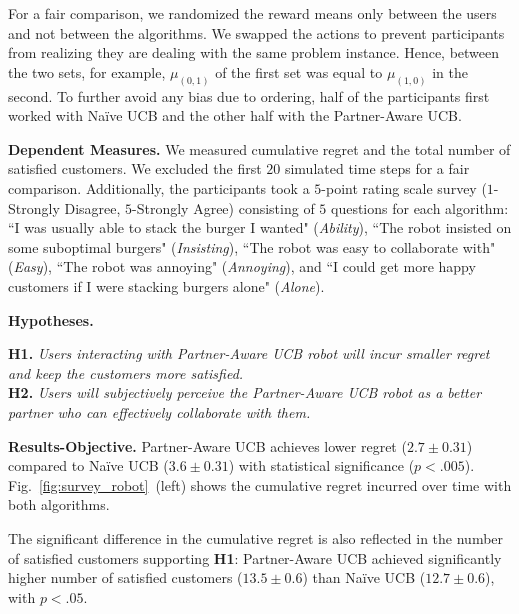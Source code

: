 \documentclass[letterpaper]{article} %
\theoremstyle{definition}
\renewenvironment{quote}
  {\list{}{\rightmargin=0cm \leftmargin=0.25cm}%
   \item\relax}
  {\endlist}
\begin{document}
For a fair comparison, we randomized the reward means only between the users and not between the algorithms.
We swapped the actions to prevent participants from realizing they are dealing with the same problem instance. Hence, between the two sets, for example, $\mu_{(0,1)}$ of the first set was equal to $\mu_{(1,0)}$ in the second. 
To further avoid any bias due to ordering, half of the participants first worked with Na\"ive UCB and the other half with the Partner-Aware UCB.

\smallskip
\noindent\textbf{Dependent Measures.} 
We measured cumulative regret and the total number of satisfied customers. We excluded the first $20$ simulated time steps for a fair comparison. Additionally, the participants took a $5$-point rating scale survey ($1$-Strongly Disagree, $5$-Strongly Agree) consisting of $5$ questions for each algorithm: ``I was usually able to stack the burger I wanted" (\emph{Ability}), ``The robot insisted on some suboptimal burgers" (\emph{Insisting}), ``The robot was easy to collaborate with" (\emph{Easy}), ``The robot was annoying" (\emph{Annoying}), and ``I could get more happy customers if I were stacking burgers alone" (\emph{Alone}).


\smallskip
\noindent\textbf{Hypotheses.}
\begin{quote}
    \textbf{H1.} \textit{Users interacting with Partner-Aware UCB robot will incur smaller regret and keep the customers more satisfied.}\\
    \textbf{H2.} \textit{Users will subjectively perceive the Partner-Aware UCB robot as a better partner who can effectively collaborate with them.}
\end{quote}


\noindent\textbf{Results-Objective.}
Partner-Aware UCB achieves lower regret ($2.7\pm0.31$) compared to Na\"ive UCB ($3.6\pm0.31$) with statistical significance ($p<.005$). Fig.~\ref{fig:survey_robot}~(left) shows the cumulative regret incurred over time with both algorithms.

The significant difference in the cumulative regret is also reflected in the number of satisfied customers supporting \textbf{H1}: Partner-Aware UCB achieved significantly higher number of satisfied customers ($13.5\pm0.6$) than Na\"ive UCB ($12.7\pm0.6$), with $p<.05$.
\end{document}
